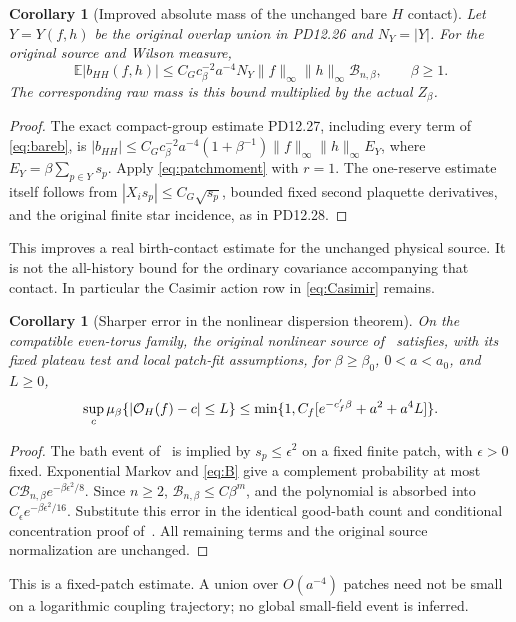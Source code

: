 \documentclass[11pt,letterpaper]{article}
\theoremstyle{plain}
\newtheorem{corollary}[theorem]{Corollary}
\theoremstyle{remark}\newtheorem{remark}[theorem]{Scope}
\newcommand{\E}{\mathbb E}\newcommand{\R}{\mathbb R}
\begin{document}
\begin{corollary}[Improved absolute mass of the unchanged bare $H$ contact]
\label{cor:originalcontact}
Let $Y=Y(f,h)$ be the original overlap union in PD12.26 and $N_Y=|Y|$.
For the original source and Wilson measure,
\begin{equation}
\E|b_{HH}(f,h)|
\le C_Gc_\beta^{-2}a^{-4}N_Y
\|f\|_\infty\|h\|_\infty\mathcal B_{n,\beta},\qquad\beta\ge1.
\label{eq:originalcontactmass}
\end{equation}
The corresponding raw mass is this bound multiplied by the actual $Z_\beta$.
\end{corollary}
\begin{proof}
The exact compact-group estimate PD12.27, including every term of
\eqref{eq:bareb}, is
$|b_{HH}|\le C_Gc_\beta^{-2}a^{-4}(1+\beta^{-1})\|f\|_\infty\|h\|_\infty E_Y$,
where $E_Y=\beta\sum_{p\in Y}s_p$. Apply \eqref{eq:patchmoment} with $r=1$.
The one-reserve estimate itself follows from
$|X_is_p|\le C_G\sqrt{s_p}$, bounded fixed second plaquette derivatives,
and the original finite star incidence, as in PD12.28.
\end{proof}
This improves a real birth-contact estimate for the unchanged physical source.
It is not the all-history bound for the ordinary covariance accompanying that
contact. In particular the Casimir action row in \eqref{eq:Casimir} remains.

\begin{corollary}[Sharper error in the nonlinear dispersion theorem]
\label{cor:dispersion}
On the compatible even-torus family, the original nonlinear source of~\cite[\S2]{ND}
satisfies, with its fixed plateau test and local patch-fit assumptions, for
$\beta\ge\beta_0$, $0<a<a_0$, and $L\ge0$,
\begin{equation}
\sup_c\mu_\beta\{|\mathcal O_H(f)-c|\le L\}
\le\min\{1,C_f[e^{-c_f'\beta}+a^2+a^4L]\}.
\label{eq:sharperdispersion}
\end{equation}
\end{corollary}
\begin{proof}
The bath event of~\cite[\S2.1]{ND} is implied by $s_p\le\epsilon^2$ on a fixed finite
patch, with $\epsilon>0$ fixed. Exponential Markov and \eqref{eq:B} give a
complement probability at most $C\mathcal B_{n,\beta}e^{-\beta\epsilon^2/8}$.
Since $n\ge2$, $\mathcal B_{n,\beta}\le C\beta^m$, and the polynomial is absorbed
into $C_\epsilon e^{-\beta\epsilon^2/16}$. Substitute this error in the identical
good-bath count and conditional concentration proof of~\cite[\S\S2.1--2.4]{ND}. All remaining
terms and the original source normalization are unchanged.
\end{proof}
This is a fixed-patch estimate. A union over $O(a^{-4})$ patches need not be small
on a logarithmic coupling trajectory; no global small-field event is inferred.
\end{document}
